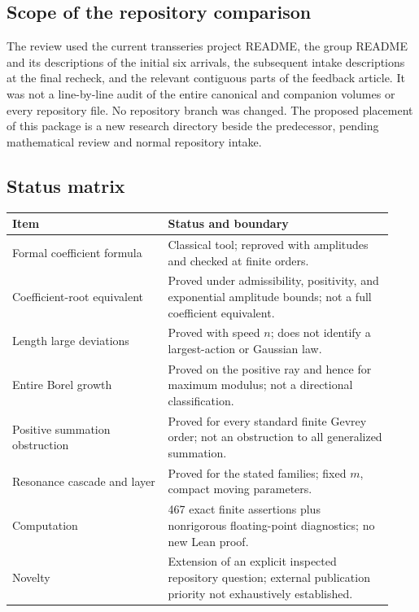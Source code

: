 \documentclass[11pt,a4paper]{article}
\numberwithin{equation}{section}
\theoremstyle{definition}
\theoremstyle{remark}
\begin{document}
\subsection{Scope of the repository comparison}
The review used the current transseries project README, the group README
and its descriptions of the initial six arrivals, the subsequent intake
descriptions at the final recheck, and the relevant contiguous parts of
the feedback article. It was not a line-by-line audit of the
entire canonical and companion volumes or every repository file.
No repository branch was changed. The proposed placement of this package
is a new research directory beside the predecessor, pending mathematical
review and normal repository intake.

\subsection{Status matrix}
\begin{center}\small
\begin{tabular}{@{}p{0.38\linewidth}p{0.55\linewidth}@{}}
\toprule
Item & Status and boundary\\
\midrule
Formal coefficient formula & Classical tool; reproved with amplitudes and checked at finite orders.\\[3pt]
Coefficient-root equivalent & Proved under admissibility, positivity, and exponential amplitude bounds; not a full coefficient equivalent.\\[3pt]
Length large deviations & Proved with speed $n$; does not identify a largest-action or Gaussian law.\\[3pt]
Entire Borel growth & Proved on the positive ray and hence for maximum modulus; not a directional classification.\\[3pt]
Positive summation obstruction & Proved for every standard finite Gevrey order; not an obstruction to all generalized summation.\\[3pt]
Resonance cascade and layer & Proved for the stated families; fixed $m$, compact moving parameters.\\[3pt]
Computation & 467 exact finite assertions plus nonrigorous floating-point diagnostics; no new Lean proof.\\[3pt]
Novelty & Extension of an explicit inspected repository question; external publication priority not exhaustively established.\\
\bottomrule
\end{tabular}
\end{center}
\end{document}
